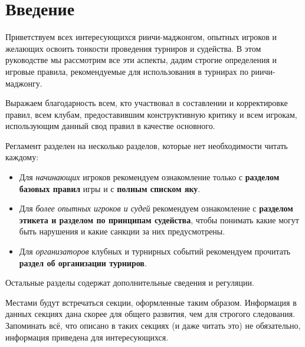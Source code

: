 \section{Введение}

Приветствуем всех интересующихся риичи-маджонгом, опытных игроков и желающих освоить тонкости проведения турниров и судейства. В этом руководстве мы рассмотрим все эти аспекты, дадим строгие определения и игровые правила, рекомендуемые для использования в турнирах по риичи-маджонгу.

Выражаем благодарность всем, кто участвовал в составлении и корректировке правил, всем клубам, предоставившим конструктивную критику и всем игрокам, использующим данный свод правил в качестве основного.

Регламент разделен на несколько разделов, которые нет необходимости читать каждому:
\begin{itemize}
	\item Для \textit{начинающих} игроков рекомендуем ознакомление только с \textbf{разделом базовых правил} игры и с \textbf{полным списком яку}.
	\item Для \textit{более опытных игроков и судей} рекомендуем ознакомление с \textbf{разделом этикета и разделом по принципам судейства}, чтобы понимать какие могут быть нарушения и какие санкции за них предусмотрены.
	\item Для \textit{организаторов} клубных и турнирных событий рекомендуем прочитать \textbf{раздел об организации турниров}. 
\end{itemize}
Остальные разделы содержат дополнительные сведения и регуляции.

\begin{additional}
	
	Местами будут встречаться секции, оформленные таким образом. Информация в данных секциях дана скорее для общего развития, чем для строгого следования. Запоминать всё, что описано в таких секциях (и даже читать это) не обязательно, информация приведена для интересующихся.
\end{additional}